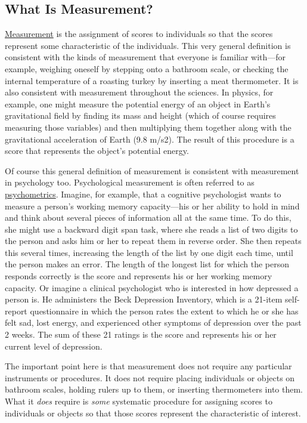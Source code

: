 \documentclass[
]{krantz}
\begin{document}
\hypertarget{what-is-measurement}{%
\subsection*{What Is Measurement?}\label{what-is-measurement}}


\protect\hyperlink{measurement}{Measurement} is the assignment of scores to individuals so that the scores represent some characteristic of the individuals. This very general definition is consistent with the kinds of measurement that everyone is familiar with---for example, weighing oneself by stepping onto a bathroom scale, or checking the internal temperature of a roasting turkey by inserting a meat thermometer. It is also consistent with measurement throughout the sciences. In physics, for example, one might measure the potential energy of an object in Earth's gravitational field by finding its mass and height (which of course requires measuring those variables) and then multiplying them together along with the gravitational acceleration of Earth (9.8 m/s2). The result of this procedure is a score that represents the object's potential energy.

Of course this general definition of measurement is consistent with measurement in psychology too. Psychological measurement is often referred to as \protect\hyperlink{psychometrics}{psychometrics}. Imagine, for example, that a cognitive psychologist wants to measure a person's working memory capacity---his or her ability to hold in mind and think about several pieces of information all at the same time. To do this, she might use a backward digit span task, where she reads a list of two digits to the person and asks him or her to repeat them in reverse order. She then repeats this several times, increasing the length of the list by one digit each time, until the person makes an error. The length of the longest list for which the person responds correctly is the score and represents his or her working memory capacity. Or imagine a clinical psychologist who is interested in how depressed a person is. He administers the Beck Depression Inventory, which is a 21-item self-report questionnaire in which the person rates the extent to which he or she has felt sad, lost energy, and experienced other symptoms of depression over the past 2 weeks. The sum of these 21 ratings is the score and represents his or her current level of depression.

The important point here is that measurement does not require any particular instruments or procedures. It does not require placing individuals or objects on bathroom scales, holding rulers up to them, or inserting thermometers into them. What it \emph{does} require is \emph{some} systematic procedure for assigning scores to individuals or objects so that those scores represent the characteristic of interest.
\end{document}
